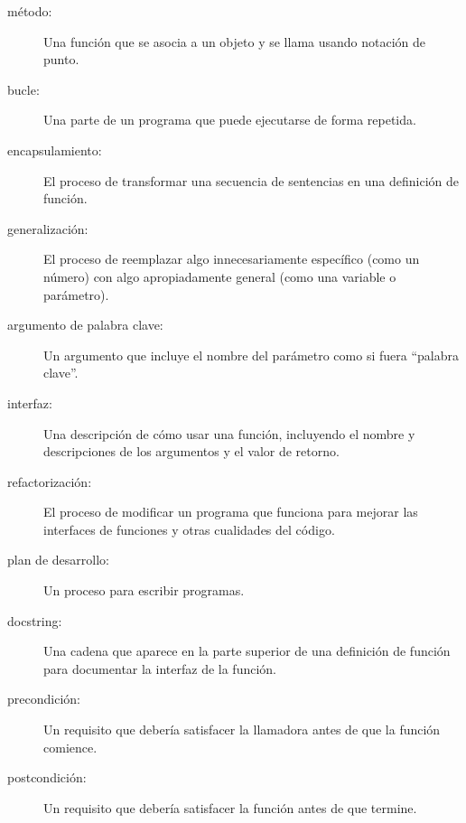 \documentclass[10pt]{book}
\begin{document}
\begin{description}

\item[método:] Una función que se asocia a un objeto y se llama
usando notación de punto.

\item[bucle:] Una parte de un programa que puede ejecutarse de forma repetida.

\item[encapsulamiento:] El proceso de transformar una secuencia de
sentencias en una definición de función.

\item[generalización:] El proceso de reemplazar algo
innecesariamente específico (como un número) con algo apropiadamente
general (como una variable o parámetro).

\item[argumento de palabra clave:] Un argumento que incluye el nombre del
parámetro como si fuera ``palabra clave''.

\item[interfaz:] Una descripción de cómo usar una función, incluyendo
el nombre y descripciones de los argumentos y el valor de retorno.

\item[refactorización:] El proceso de modificar un programa que funciona para
  mejorar las interfaces de funciones y otras cualidades del código.

\item[plan de desarrollo:] Un proceso para escribir programas.

\item[docstring:] Una cadena que aparece en la parte superior de una definición
  de función para documentar la interfaz de la función.

\item[precondición:] Un requisito que debería satisfacer la
llamadora antes de que la función comience.

\item[postcondición:] Un requisito que debería satisfacer la
función antes de que termine.

\end{description}
\end{document}
